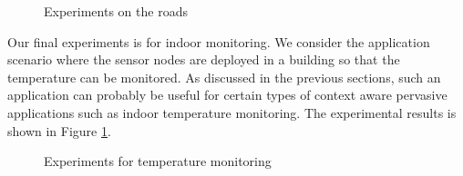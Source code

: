 \begin{figure}
\centering
{}
{}
\caption{Experiments on the roads}
\label{fig:itsResults}
\end{figure}

Our final experiments is for indoor monitoring. We consider the application scenario where the sensor nodes are deployed in a building so that the temperature can be monitored. As discussed in the previous sections, such an application can probably be useful for certain types of context aware pervasive applications such as indoor temperature monitoring. The experimental results is shown in Figure \ref{fig:itsResults}. 

\begin{figure}
\centering
{}
{}
\caption{Experiments for temperature monitoring}
\label{fig:indoorResult}
\end{figure}